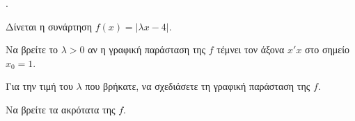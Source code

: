 \documentclass[11pt,a4paper,twocolumn]{article}
\newcounter{askhsh}
\newcommand{\askhsh}{\large\theaskhsh.\ \addtocounter{askhsh}{1}}
\begin{document}
\askhsh Δίνεται η συνάρτηση $f(x)=|\lambda x-4|$.
\begin{alist}
    \item Να βρείτε το $\lambda>0$ αν η γραφική παράσταση της $f$ τέμνει τον άξονα $x'x$ στο σημείο $x_0=1$.
    \item Για την τιμή του $\lambda$ που βρήκατε, να σχεδιάσετε τη γραφική παράσταση της $f$.
    \item Να βρείτε τα ακρότατα της $f$.
\end{alist}
\end{document}
